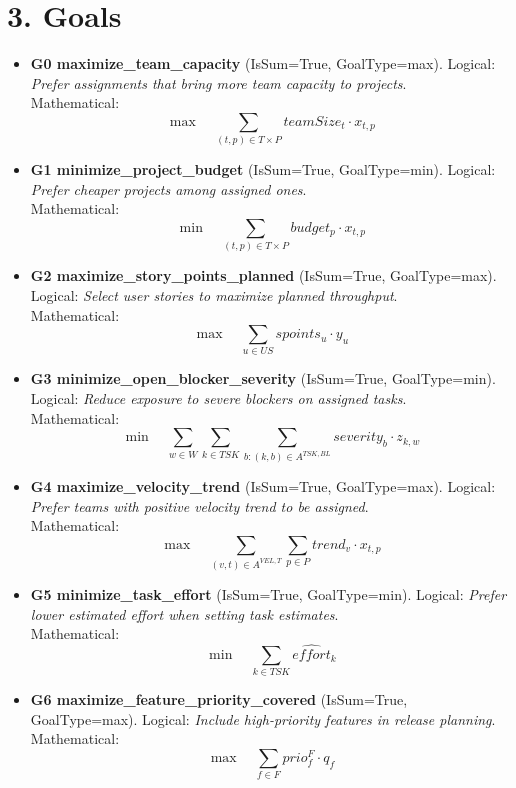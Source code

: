 \documentclass[11pt]{article}
\begin{document}
\section{3. Goals}
\begin{itemize}[leftmargin=2em]

  \item \textbf{G0 maximize\_team\_capacity} (IsSum=True, GoalType=max). Logical: \emph{Prefer assignments that bring more team capacity to projects}. \\
  Mathematical:
  \[
    \max \quad \sum_{(t,p)\in T\times P} teamSize_t \cdot x_{t,p}
  \]

  \item \textbf{G1 minimize\_project\_budget} (IsSum=True, GoalType=min). Logical: \emph{Prefer cheaper projects among assigned ones}. \\
  Mathematical:
  \[
    \min \quad \sum_{(t,p)\in T\times P} budget_p \cdot x_{t,p}
  \]

  \item \textbf{G2 maximize\_story\_points\_planned} (IsSum=True, GoalType=max). Logical: \emph{Select user stories to maximize planned throughput}. \\
  Mathematical:
  \[
    \max \quad \sum_{u\in US} spoints_u \cdot y_u
  \]

  \item \textbf{G3 minimize\_open\_blocker\_severity} (IsSum=True, GoalType=min). Logical: \emph{Reduce exposure to severe blockers on assigned tasks}. \\
  Mathematical:
  \[
    \min \quad \sum_{w\in W}\sum_{k\in TSK}\sum_{b:(k,b)\in A^{TSK,BL}} severity_b \cdot z_{k,w}
  \]

  \item \textbf{G4 maximize\_velocity\_trend} (IsSum=True, GoalType=max). Logical: \emph{Prefer teams with positive velocity trend to be assigned}. \\
  Mathematical:
  \[
    \max \quad \sum_{(v,t)\in A^{VEL,T}}\sum_{p\in P} trend_v \cdot x_{t,p}
  \]

  \item \textbf{G5 minimize\_task\_effort} (IsSum=True, GoalType=min). Logical: \emph{Prefer lower estimated effort when setting task estimates}. \\
  Mathematical:
  \[
    \min \quad \sum_{k\in TSK} \widehat{effort}_k
  \]

  \item \textbf{G6 maximize\_feature\_priority\_covered} (IsSum=True, GoalType=max). Logical: \emph{Include high-priority features in release planning}. \\
  Mathematical:
  \[
    \max \quad \sum_{f\in F} prio^F_f \cdot q_f
  \]


\end{itemize}
\end{document}
